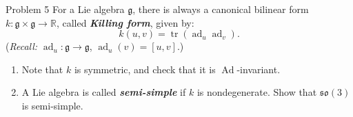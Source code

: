 \begin{thing1}{Problem 5}\leavevmode
For a Lie algebra $\mathfrak{g}$, there is always a canonical bilinear form $k:\mathfrak{g} \times \mathfrak{g} \to \mathbb{R}$, called \textit{\textbf{Killing form}}, given by:
\[k(u,v)=\operatorname{tr}(\operatorname{ad}_u\operatorname{ad}_v).\]
(\textit{Recall:} $\operatorname{ad}_u:\mathfrak{g} \to \mathfrak{g}$, $\operatorname{ad}_u(v)=[u,v]$.)
\begin{enumerate}[label=\alph*.]
	\item Note that $k$ is symmetric, and check that it is  $\operatorname{Ad}$-invariant.
	\item A Lie algebra is called \textit{\textbf{semi-simple}} if $k$ is nondegenerate. Show that $\mathfrak{so}(3)$ is semi-simple.
\end{enumerate}
\end{thing1}

